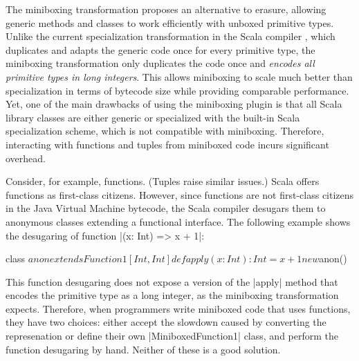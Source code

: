 
The miniboxing transformation \cite{miniboxing} proposes an alternative to erasure, allowing generic methods and classes to work efficiently with unboxed primitive types. Unlike the current specialization transformation in the Scala compiler \cite{iuli-thesis}, which duplicates and adapts the generic code once for every primitive type, the miniboxing transformation only duplicates the code once and \emph{encodes all primitive types in long integers}. This allows miniboxing to scale much better than specialization \cite{miniboxing-linkedlist} in terms of bytecode size while providing comparable performance. Yet, one of the main drawbacks of using the miniboxing plugin is that all Scala library classes are either generic or specialized with the built-in Scala specialization scheme, which is not compatible with miniboxing. Therefore, interacting with functions and tuples from miniboxed code incurs significant overhead.

Consider, for example, functions. (Tuples raise similar issues.) Scala offers functions as first-class citizens. However, since functions are not first-class citizens in the Java Virtual Machine bytecode, the Scala compiler desugars them to anonymous classes extending a functional interface. The following example shows the desugaring of function |(x: Int) => x + 1|:

\begin{lstlisting-nobreak}
class $anon extends Function1[Int, Int] {
  def apply(x: Int): Int = x + 1
}
new $anon()
\end{lstlisting-nobreak}

This function desugaring does not expose a version of the |apply| method that encodes the primitive type as a long integer, as the miniboxing transformation expects. Therefore, when programmers write miniboxed code that uses functions, they have two choices: either accept the slowdown caused by converting the represenation or define their own |MiniboxedFunction1| class, and perform the function desugaring by hand. Neither of these is a good solution.

